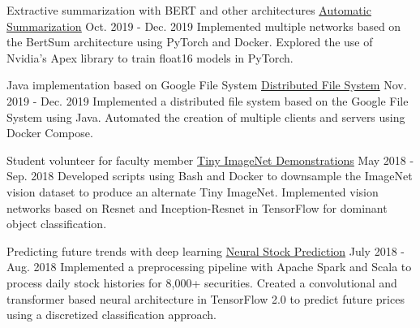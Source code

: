 

\begin{cventries}

  \cventry
  	{Extractive summarization with BERT and other architectures} %
		{
			\href{https://github.com/TidalPaladin/neural-summarizer}
      {\underline{Automatic Summarization}}
		} %
  	{Oct. 2019 - Dec. 2019} %
    {} %
	{
    Implemented multiple networks based on the BertSum architecture using PyTorch 
    and Docker. Explored the use of Nvidia's Apex library to train float16 models 
    in PyTorch.
	}

  \cventry
  	{Java implementation based on Google File System} %
		{
			\href{https://github.com/TidalPaladin/distributed-fs}
      {\underline{Distributed File System}}
		} %
  	{Nov. 2019 - Dec. 2019} %
    {} %
	{
    Implemented a distributed file system based on the Google File System using
    Java. Automated the creation of multiple clients and servers using 
    Docker Compose.
	}

  \cventry
  	{Student volunteer for faculty member} %
		{
			\href{https://github.com/TidalPaladin/tiny-imagenet-demo}
      {\underline{Tiny ImageNet Demonstrations}}
		} %
  	{May 2018 - Sep. 2018} %
    {} %
	{
		Developed scripts using Bash and Docker to downsample
		the ImageNet vision dataset to produce an alternate Tiny ImageNet.
		Implemented vision networks based on Resnet and
		Inception-Resnet in TensorFlow for dominant object
		classification.
	}

  \cventry
  	{Predicting future trends with deep learning} %
		{
			\href{https://github.com/TidalPaladin/trader}
      {\underline{Neural Stock Prediction}}
		} %
  	{July 2018 - Aug. 2018} %
    {} %
	{
		Implemented a preprocessing pipeline with Apache Spark and Scala
		to process daily stock histories for 8,000+ securities.
		Created a convolutional and transformer based neural architecture
		in TensorFlow 2.0 to predict future prices using a discretized
		classification approach.
	}

\end{cventries}
